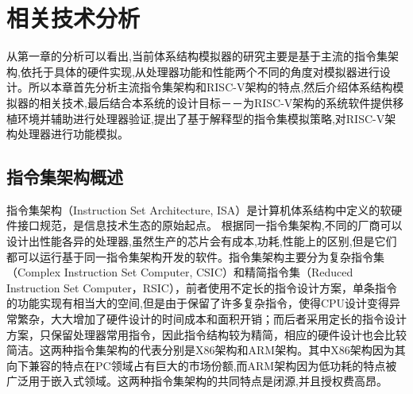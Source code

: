 
\chapter{相关技术分析}

从第一章的分析可以看出,当前体系结构模拟器的研究主要是基于主流的指令集架构,依托于具体的硬件实现,从处理器功能和性能两个不同的角度对模拟器进行设计。所以本章首先分析主流指令集架构和RISC-V架构的特点,然后介绍体系结构模拟器的相关技术,最后结合本系统的设计目标－－为RISC-V架构的系统软件提供移植环境并辅助进行处理器验证,提出了基于解释型的指令集模拟策略,对RISC-V架构处理器进行功能模拟。

\section{指令集架构概述}

指令集架构（Instruction Set Architecture, ISA）是计算机体系结构中定义的软硬件接口规范，是信息技术生态的原始起点\cite{刘畅2021risc}。
根据同一指令集架构,不同的厂商可以设计出性能各异的处理器,虽然生产的芯片会有成本,功耗,性能上的区别,但是它们都可以运行基于同一指令集架构开发的软件。指令集架构主要分为复杂指令集（Complex Instruction Set Computer, CSIC）和精简指令集（Reduced Instruction Set Computer，RSIC），前者使用不定长的指令设计方案，单条指令的功能实现有相当大的空间,但是由于保留了许多复杂指令，使得CPU设计变得异常繁杂，大大增加了硬件设计的时间成本和面积开销\cite{王雅婕2020用于能量计量的}；而后者采用定长的指令设计方案，只保留处理器常用指令，因此指令结构较为精简，相应的硬件设计也会比较简洁。这两种指令集架构的代表分别是X86架构和ARM架构。其中X86架构因为其向下兼容的特点在PC领域占有巨大的市场份额,而ARM架构因为低功耗的特点被广泛用于嵌入式领域。这两种指令集架构的共同特点是闭源,并且授权费高昂。



